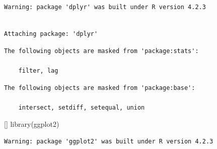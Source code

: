 \documentclass[12pt,letterpaper]{article}
\newenvironment{Shaded}{\begin{snugshade}}{\end{snugshade}}
\newenvironment{Highlighting}{}{}
\newcommand{\FunctionTok}[1]{\textcolor[rgb]{0.00,0.00,0.00}{#1}}
\newcommand{\NormalTok}[1]{#1}
\begin{document}
\begin{verbatim}
Warning: package 'dplyr' was built under R version 4.2.3
\end{verbatim}

\begin{verbatim}

Attaching package: 'dplyr'
\end{verbatim}

\begin{verbatim}
The following objects are masked from 'package:stats':

    filter, lag
\end{verbatim}

\begin{verbatim}
The following objects are masked from 'package:base':

    intersect, setdiff, setequal, union
\end{verbatim}

\begin{Shaded}
\begin{Highlighting}[]
\FunctionTok{library}\NormalTok{(ggplot2)}
\end{Highlighting}
\end{Shaded}

\begin{verbatim}
Warning: package 'ggplot2' was built under R version 4.2.3
\end{verbatim}
\end{document}
